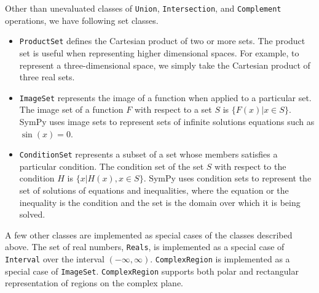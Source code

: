 
Other than unevaluated classes of \texttt{Union}, \texttt{Intersection}, and
\texttt{Complement} operations, we have following set classes.

\begin{itemize}

    \item \verb|ProductSet| defines the Cartesian product of two
        or more sets. The product set is useful when representing higher
        dimensional spaces. For example, to represent a three-dimensional space,
        we simply take the Cartesian product of three real sets.

      \item \verb|ImageSet| represents the image of a function when applied to
        a particular set. The image set of a function $F$ with respect to a set
        $S$ is $\{ F(x) | x \in S \}$. SymPy uses image sets to represent sets
        of infinite solutions equations such as $\sin(x)=0$.


      \item \verb|ConditionSet| represents a subset of a set whose members
        satisfies a particular condition. The condition set of the set $S$ with
        respect to the condition $H$ is $\{x | H(x), x \in S \}$. SymPy uses
        condition sets to represent the set of solutions of equations and
        inequalities, where the equation or the inequality is the condition and
        the set is the domain over which it is being solved.

\end{itemize}

A few other classes are implemented as special cases of the classes described
above. The set of real numbers, \verb|Reals|, is implemented as a special case
of \verb|Interval| over the interval $(-\infty, \infty)$. \verb|ComplexRegion|
is implemented as a special case of \verb|ImageSet|. \verb|ComplexRegion|
supports both polar and rectangular representation of regions on the complex
plane.
